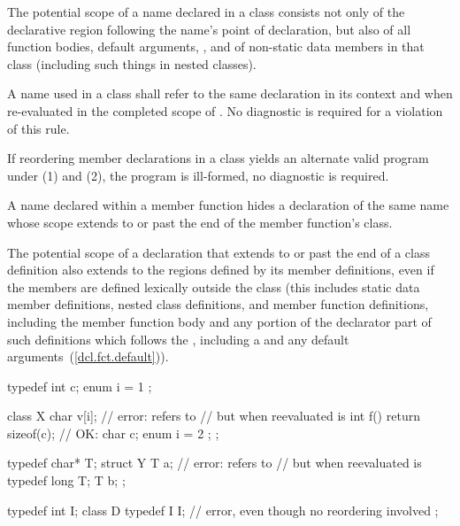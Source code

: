 \begin{enumeraten}
\item The potential scope of a name declared in a class consists not
only of the declarative region following the name's point of
declaration, but also of all function bodies, default arguments,
, and
 of non-static data members
in that class (including such
things in nested classes).
\item A name  used in a class  shall refer to the same
declaration in its context and when re-evaluated in the completed scope
of . No diagnostic is required for a violation of this rule.
\item If reordering member declarations in a class yields an alternate
valid program under (1) and (2), the program is ill-formed, no
diagnostic is required.
\item A name declared within a member function hides a declaration of
the same name whose scope extends to or past the end of the member
function's class.
\item The potential scope of a declaration that extends to or past the
end of a class definition also extends to the regions defined by its
member definitions, even if the members are defined lexically outside
the class (this includes static data member definitions, nested class
definitions, and member function definitions, including the member function
body and any portion of the
declarator part of such definitions which follows the ,
including a  and any default
arguments~(\ref{dcl.fct.default})).\enterexample

\begin{codeblock}
typedef int  c;
enum { i = 1 };

class X {
  char  v[i];                       // error:  refers to 
                                    // but when reevaluated is 
  int  f() { return sizeof(c); }    //  OK: 
  char  c;
  enum { i = 2 };
};

typedef char*  T;
struct Y {
  T  a;                             // error:  refers to 
                                    // but when reevaluated is 
  typedef long  T;
  T  b;
};

typedef int I;
class D {
  typedef I I;                      // error, even though no reordering involved
};
\end{codeblock}
\exitexample
\end{enumeraten}

